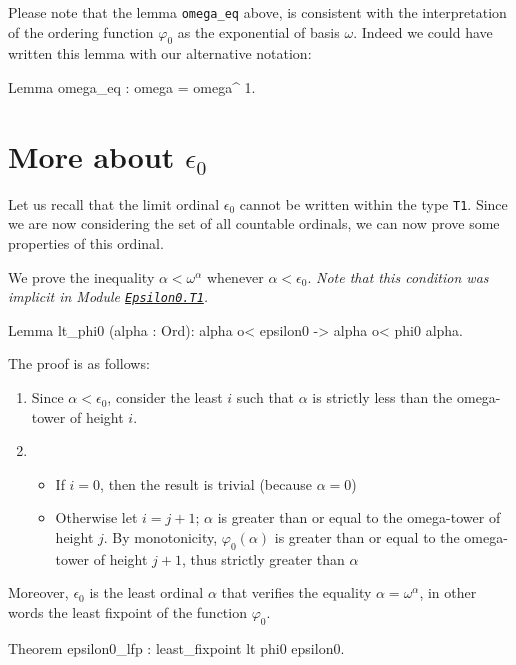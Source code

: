 {Please note that the lemma \texttt{omega\_eq} above, is consistent with the interpretation of the ordering function $\varphi_0$ as the exponential of basis $\omega$. Indeed we could have written this lemma with our alternative notation:

\begin{Coqsrc}
 Lemma omega_eq : omega = omega^ 1.
\end{Coqsrc}

\section{More about \texorpdfstring{$\epsilon_0$}{\texttt{epsilon0}}}

Let us recall that the limit ordinal  $\epsilon_0$ cannot be written within the type \texttt{T1}. Since we are now considering the set of all countable ordinals, we can now prove some properties of this ordinal.


We prove the inequality  $\alpha<\omega^\alpha$ whenever $\alpha < \epsilon_0$.
\emph{Note that this condition was implicit in Module \href{../src/html/hydras.Epsilon0/T1.html\#lt_phi0}%
{\texttt{Epsilon0.T1}}.}

\begin{Coqsrc}
Lemma lt_phi0 (alpha : Ord):
  alpha o< epsilon0 -> alpha o< phi0 alpha.
\end{Coqsrc}

The proof is as follows:
\begin{enumerate}
\item Since $\alpha<\epsilon_0$, consider the least $i$ such that $\alpha$ is strictly less than the omega-tower of height $i$.
\item
  \begin{itemize}
  \item If $i=0$, then the result is trivial (because $\alpha=0$)
 \item  Otherwise let $i=j+1$; 
          $\alpha$ is greater than or equal to the omega-tower of height $j$.
         By monotonicity,  $\varphi_0(\alpha)$ is greater than or equal to 
        the omega-tower of height $j+1$, thus strictly greater than $\alpha$
  \end{itemize}
 \end{enumerate}

Moreover,  $\epsilon_0$ is the least ordinal $\alpha$ that verifies the equality 
$\alpha = \omega^\alpha$, in other words the least fixpoint of the function  $\varphi_0$.

\begin{Coqsrc}
Theorem epsilon0_lfp : least_fixpoint lt phi0 epsilon0.
\end{Coqsrc}


}
